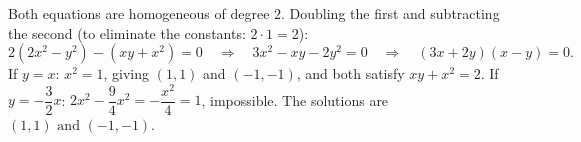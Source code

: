 Both equations are homogeneous of degree $2$. Doubling the first and subtracting the second (to eliminate the constants: $2\cdot1=2$):
\[
2(2x^2-y^2)-(xy+x^2)=0\quad\Longrightarrow\quad3x^2-xy-2y^2=0\quad\Longrightarrow\quad(3x+2y)(x-y)=0 .
\]
If $y=x$: $x^2=1$, giving $(1,1)$ and $(-1,-1)$, and both satisfy $xy+x^2=2$. If $y=-\dfrac{3}{2}x$: $2x^2-\dfrac{9}{4}x^2=-\dfrac{x^2}{4}=1$, impossible. The solutions are $\boxed{(1,1)\text{ and }(-1,-1)}$.
